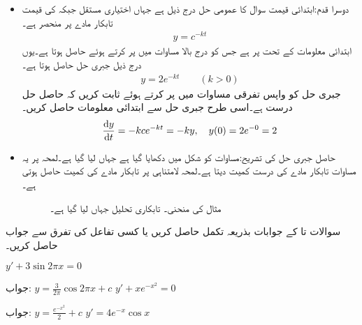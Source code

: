 \begin{itemize}
\item
دوسرا قدم:ابتدائی قیمت سوال کا عمومی حل درج ذیل ہے جہاں  اختیاری مستقل جبکہ  کی قیمت تابکار مادے پر منحصر ہے۔
\begin{align}
y=c^{-kt}
\end{align}
ابتدائی معلومات کے تحت  پر  ہے جس کو درج بالا مساوات میں پر کرتے ہوئے  حاصل ہوتا ہے۔یوں درج ذیل جبری حل حاصل ہوتا ہے۔
\begin{align}\label{مساوات_سادہ_اول_جبری_تابکاری}
y=2e^{-kt}\quad \quad (k>0)
\end{align} 
جبری حل کو واپس تفرقی مساوات میں پر کرتے ہوئے ثابت کریں کہ حاصل حل درست ہے۔اسی طرح جبری حل سے ابتدائی معلومات حاصل کریں۔
\begin{align*}
\frac{\dif y}{\dif t}=-k ce^{-kt}=-ky, \quad y(0)=2e^{-0}=2
\end{align*}
%
\item
حاصل جبری حل کی تشریح:مساوات  کو شکل  میں دکھایا گیا ہے جہاں  لیا گیا ہے۔لمحہ  پر یہ مساوات تابکار مادے کی درست کمیت دیتا ہے۔لمحہ لامتناہی پر تابکار مادے کی کمیت  حاصل ہوتی ہے۔
\begin{figure}
\centering
{}
\caption{مثال  کی منحنی۔ تابکاری تحلیل  جہاں  لیا گیا ہے۔}
\label{شکل_مثال_اول_سادہ_تابکاری_الف}
\end{figure} 
%
\end{itemize}

سوالات  تا  کے جوابات بذریعہ تکمل حاصل کریں یا کسی تفاعل کی تفرق سے جواب حاصل کریں۔

\quad
$y'+3\sin 2\pi x=0$

جواب:\quad
  $y=\frac{3}{2\pi} \cos 2\pi x+c$
\quad
$y'+xe^{-x^2}=0$

جواب:\quad
$y=\tfrac{e^{-x^2}}{2}+c$
\quad
$y'=4e^{-x}\cos x$

